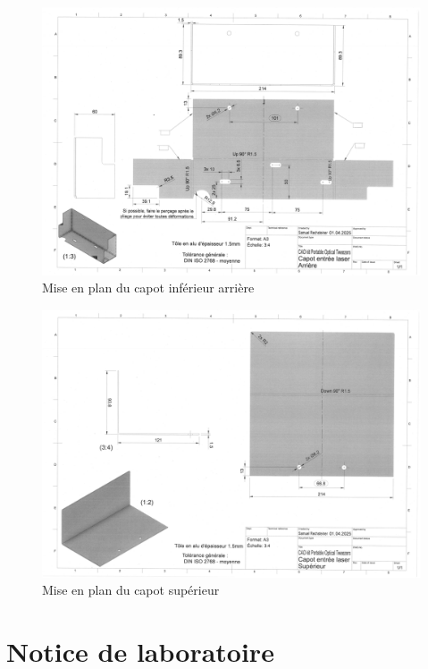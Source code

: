 \begin{figure}[H]
    \centering
    \includegraphics[angle=90,width=\textwidth]{assets/figures/Annexes/Mises_en_plan/mise_en_plan_arriere.png}
    \caption{Mise en plan du capot inférieur arrière}
    \label{mise_en_plan_capot_arriere}
\end{figure}

\begin{figure}[H]
    \centering
    \includegraphics[angle=90,width=\textwidth]{assets/figures/Annexes/Mises_en_plan/mise_en_plan_superieur.png}
    \caption{Mise en plan du capot supérieur}
    \label{mise_en_plan_capot_superieur}
\end{figure}

\clearpage
\section*{Notice de laboratoire} \label{annexe:notice_labo}
